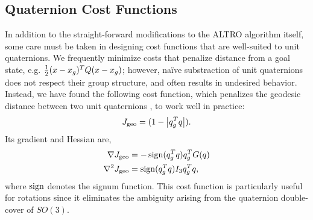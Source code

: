 \documentclass[../root.tex]{subfiles}
\begin{document}
    \subsection{Quaternion Cost Functions} \label{sec:cost_functions}
        In addition to the straight-forward modifications to the ALTRO algorithm itself, some care must be taken in designing cost functions that are well-suited to unit quaternions. We
        frequently minimize costs that penalize distance from a goal state, e.g. $\frac{1}{2}
        (x-x_g)^T Q (x-x_g)$; however, na\"ive substraction of unit quaternions does not respect their group structure, and often results in undesired behavior. Instead, we have found the following cost function, which penalizes the geodesic
        distance between two unit quaternions \cite{kuffner_Effective_2004}, to work well in practice:
        \begin{equation} \label{eq:quat_geodesic}
            J_\text{geo} = (1-\abs{q_g^T q}) .
        \end{equation}
        Its gradient and Hessian are,
        \begin{align}
            \nabla J_\text{geo} &= -\operatorname{sign}(q_g^T q) q_g^T G(q) \\
            \nabla^2 J_\text{geo} &= \operatorname{sign}(q_g^T q) I_3 q_g^T q ,
        \end{align}
        where $\operatorname{sign}$ denotes the signum function. This cost function is particularly
        useful for rotations since it eliminates the ambiguity arising from the quaternion 
        double-cover of $SO(3)$.
        
\end{document}
